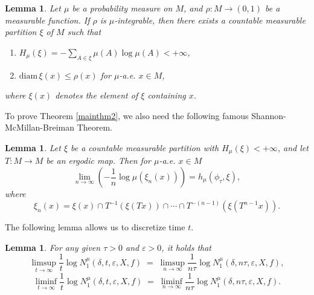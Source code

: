 \documentclass[10pt]{article}
\newtheorem*{Theorem A}{Theorem A}
\newtheorem{Lemma}[Theorem]{Lemma}
\begin{document}
\begin{Lemma}\label{lemma4.1} \cite{Mane_1981} Let \(\mu\) be a probability measure on \(M\), and \(\rho: M \to (0,1)\) be a measurable function. If \(\rho\) is \(\mu\)-integrable, then there exists a countable measurable partition \(\xi\) of \(M\) such that
\begin{enumerate}
\item[1.] \(H_\mu(\xi)=-\sum_{A\in\xi} \mu(A)\log \mu(A) < +\infty\),

\item[2.]  \(\mathrm{diam}\,\xi(x) \leq \rho(x)\) for \(\mu\)-a.e. \(x \in M\),
\end{enumerate}
where \(\xi(x)\) denotes the element of \(\xi\) containing \(x\).
\end{Lemma}

To prove Theorem \ref{mainthm2}, we also need the following famous Shannon-McMillan-Breiman Theorem.

\begin{Lemma}\cite{sun2018}\label{lemma4.2}
Let \(\xi\) be a countable measurable partition with \(H_\mu(\xi)< +\infty\), and let \(T: M \to M\) be an ergodic map. Then for \(\mu\)-a.e. \(x \in M\)
\[
\lim\limits_{n \to \infty} \left( -\frac{1}{n} \log \mu(\xi_n(x)) \right) = h_{\mu}(\phi_\tau, \xi),
\]
where
\[
\xi_n(x) = \xi(x) \cap T^{-1}(\xi(Tx)) \cap \cdots \cap T^{-(n-1)}(\xi(T^{n-1}x)).
\]
\end{Lemma}

The following lemma allows us to discretize time $t$.

\begin{Lemma}\label{lemma4.3}
For any given \(\tau > 0\) and \(\varepsilon > 0\), it holds that
\[
\limsup_{t \to \infty} \frac{1}{t} \log N_1^\mu(\delta, t, \varepsilon, X, f)
\;=\;
\limsup_{n \to \infty} \frac{1}{n\tau} \log N_1^\mu(\delta, n\tau, \varepsilon, X, f),
\]
\[
\liminf_{t \to \infty} \frac{1}{t} \log N_1^\mu(\delta, t, \varepsilon, X, f)
\;=\;
\liminf_{n \to \infty} \frac{1}{n\tau} \log N_1^\mu(\delta, n\tau, \varepsilon, X, f).
\]
\end{Lemma}
\end{document}

